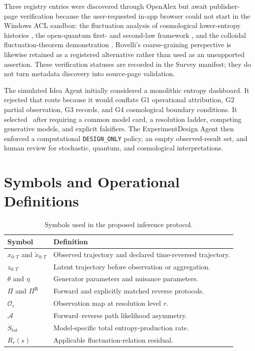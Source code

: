 Three registry entries were discovered through OpenAlex but await publisher-page verification because the user-requested in-app browser could not start in the Windows ACL sandbox: the fluctuation analysis of cosmological lower-entropy histories \cite{aguirre_carroll_johnson2012}, the open-quantum first- and second-law framework \cite{strasberg_winter2021}, and the colloidal fluctuation-theorem demonstration \cite{carberry2004}. Rovelli's coarse-graining perspective \cite{rovelli2017} is likewise retained as a registered alternative rather than used as an unsupported assertion. These verification statuses are recorded in the Survey manifest; they do not turn metadata discovery into source-page validation.

The simulated Idea Agent initially considered a monolithic entropy dashboard. It rejected that route because it would conflate G1 operational attribution, G2 partial observation, G3 records, and G4 cosmological boundary conditions. It selected \RAAT\ after requiring a common model card, a resolution ladder, competing generative models, and explicit falsifiers. The ExperimentDesign Agent then enforced a computational \texttt{DESIGN\_ONLY} policy, an empty observed-result set, and human review for stochastic, quantum, and cosmological interpretations.

\section{Symbols and Operational Definitions}

\begin{table}[!t]
\caption{Symbols used in the proposed inference protocol.}
\label{tab:symbols}
\centering
\footnotesize
\begin{tabularx}{\columnwidth}{p{}Y}
\toprule
\textbf{Symbol} & \textbf{Definition}\\
\midrule
$x_{0:T}$ and $\tilde{x}_{0:T}$ & Observed trajectory and declared time-reversed trajectory.\\
$z_{0:T}$ & Latent trajectory before observation or aggregation.\\
$\theta$ and $\eta$ & Generator parameters and nuisance parameters.\\
$\Pi$ and $\Pi^{\mathrm{R}}$ & Forward and explicitly matched reverse protocols.\\
$\mathcal{O}_{r}$ & Observation map at resolution level $r$.\\
$\mathcal{A}$ & Forward--reverse path likelihood asymmetry.\\
$\dot S_{\mathrm{tot}}$ & Model-specific total entropy-production rate.\\
$R_r(s)$ & Applicable fluctuation-relation residual.\\
\bottomrule
\end{tabularx}
\end{table}

